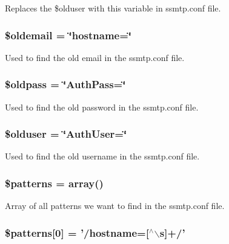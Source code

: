 \-Replaces the \$olduser with this variable in ssmtp.\-conf file. \hypertarget{changeEmail_8php_a4bc4c985021f839a471d37cee4cd84d3}{
\subsubsection[{\$oldemail}]{\setlength{\rightskip}{0pt plus 5cm}\$oldemail = \char`\"{}hostname=\char`\"{}}}\label{changeEmail_8php_a4bc4c985021f839a471d37cee4cd84d3}
\-Used to find the old email in the ssmtp.\-conf file. \hypertarget{changeEmail_8php_ac91d50aede6cea362c8a10db1ab9a916}{
\subsubsection[{\$oldpass}]{\setlength{\rightskip}{0pt plus 5cm}\$oldpass = \char`\"{}\-Auth\-Pass=\char`\"{}}}\label{changeEmail_8php_ac91d50aede6cea362c8a10db1ab9a916}
\-Used to find the old password in the ssmtp.\-conf file. \hypertarget{changeEmail_8php_ad37dae854d7ab1ccf30e1bc5e5fc8834}{
\subsubsection[{\$olduser}]{\setlength{\rightskip}{0pt plus 5cm}\$olduser = \char`\"{}\-Auth\-User=\char`\"{}}}\label{changeEmail_8php_ad37dae854d7ab1ccf30e1bc5e5fc8834}
\-Used to find the old username in the ssmtp.\-conf file. \hypertarget{changeEmail_8php_a99c668c59ad650ca9b31ad5313dc5720}{
\subsubsection[{\$patterns}]{\setlength{\rightskip}{0pt plus 5cm}\$patterns = array()}}\label{changeEmail_8php_a99c668c59ad650ca9b31ad5313dc5720}
\-Array of all patterns we want to find in the ssmtp.\-conf file. \hypertarget{changeEmail_8php_afbc27b9f7ed25335ed52087da7e8c292}{
\subsubsection[{\$patterns}]{\setlength{\rightskip}{0pt plus 5cm}\$patterns\mbox{[}0\mbox{]} = '/hostname=\mbox{[}$^\wedge$$\backslash$s\mbox{]}+/'}}\label{changeEmail_8php_afbc27b9f7ed25335ed52087da7e8c292}
